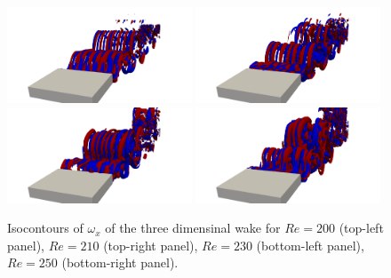 \begin{figure}
  \centering
  \includegraphics[trim={12cm 0 12cm 0},clip,width=0.49\textwidth]{./fig/Wake/AR4.5Re425.png}     
  \includegraphics[trim={12cm 0 12cm 0},clip,width=0.49\textwidth]{./fig/Wake/AR4.5Re450.png}   
  \includegraphics[trim={12cm 0 12cm 0},clip,width=0.49\textwidth]{./fig/Wake/AR4.5Re475.png} 
  \includegraphics[trim={12cm 0 12cm 0},clip,width=0.49\textwidth]{./fig/Wake/AR4.5Re500.png}
  \caption{Isocontours of $\omega_x$ of the three dimensinal wake for $Re=200$ (top-left panel), $Re=210$ (top-right panel), $Re=230$  (bottom-left panel), $Re=250$ (bottom-right panel).}
  \label{fig:wake1.5}
\end{figure}  
\fi

